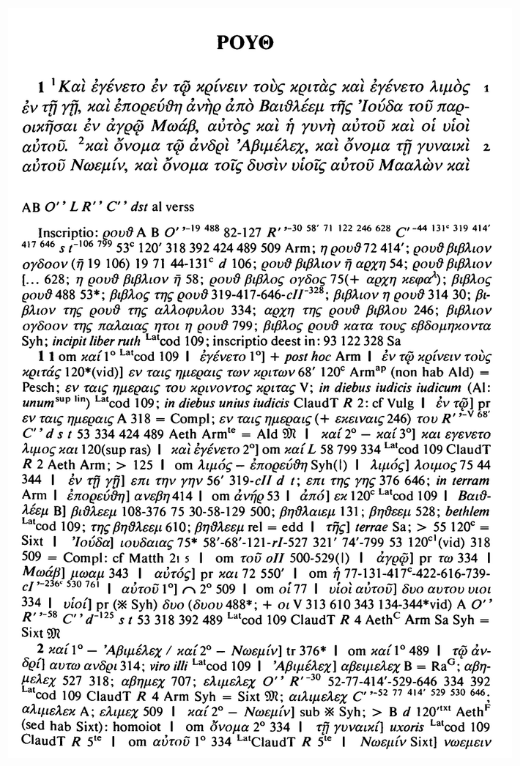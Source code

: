 \documentclass[11pt,a4paper]{article}
\begin{document}
\includegraphics[width=\textwidth]{img/LXX_ruth_1_1.png}
\newpage
\end{document}
